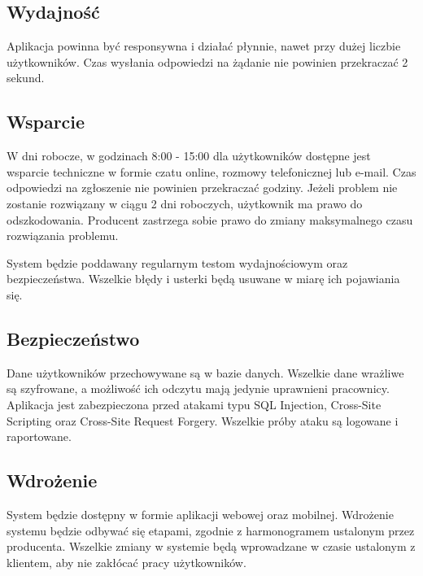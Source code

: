 \subsection{Wydajność}

Aplikacja powinna być responsywna i działać płynnie, nawet przy dużej liczbie użytkowników. Czas wysłania odpowiedzi na żądanie nie powinien przekraczać 2 sekund.

\subsection{Wsparcie}

W dni robocze, w godzinach 8:00 - 15:00 dla użytkowników dostępne jest wsparcie techniczne w formie czatu online, rozmowy telefonicznej lub e-mail. Czas odpowiedzi na zgłoszenie nie powinien przekraczać godziny. Jeżeli problem nie zostanie rozwiązany w ciągu 2 dni roboczych, użytkownik ma prawo do odszkodowania. Producent zastrzega sobie prawo do zmiany maksymalnego czasu rozwiązania problemu.

System będzie poddawany regularnym testom wydajnościowym oraz bezpieczeństwa. Wszelkie błędy i usterki będą usuwane w miarę ich pojawiania się.

\subsection{Bezpieczeństwo}

Dane użytkowników przechowywane są w bazie danych. Wszelkie dane wrażliwe są szyfrowane, a możliwość ich odczytu mają jedynie uprawnieni pracownicy. Aplikacja jest zabezpieczona przed atakami typu SQL Injection, Cross-Site Scripting oraz Cross-Site Request Forgery. Wszelkie próby ataku są logowane i raportowane.

\subsection{Wdrożenie}

System będzie dostępny w formie aplikacji webowej oraz mobilnej. Wdrożenie systemu będzie odbywać się etapami, zgodnie z harmonogramem ustalonym przez producenta. Wszelkie zmiany w systemie będą wprowadzane w czasie ustalonym z klientem, aby nie zakłócać pracy użytkowników.

